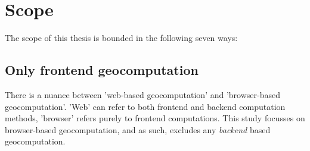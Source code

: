 
\newpage
\section{Scope}
The scope of this thesis is bounded in the following seven ways: 

\subsection*{Only frontend geocomputation}



There is a nuance between 'web-based geocomputation' and 'browser-based geocomputation'. 
'Web' can refer to both frontend and backend computation methods, 'browser' refers purely to frontend computations. 
This study focusses on browser-based geocomputation, and as such, excludes any \emph {backend} based geocomputation.

